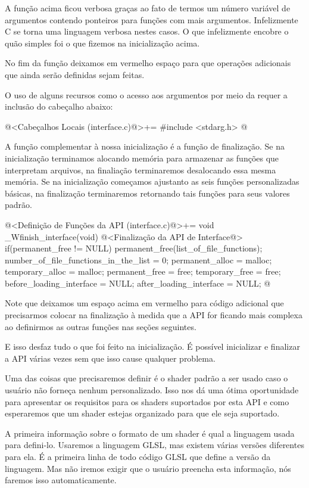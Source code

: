 A função acima ficou verbosa graças ao fato de termos um número
variável de argumentos contendo ponteiros para funções com mais
argumentos. Infelizmente C se torna uma linguagem verbosa nestes
casos. O que infelizmente encobre o quão simples foi o que fizemos na
inicialização acima.

No fim da função deixamos em vermelho espaço para que operações
adicionais que ainda serão definidas sejam feitas.

O uso de alguns recursos como o acesso aos argumentos por meio da
 requer a inclusão do cabeçalho abaixo:

\iniciocodigo
@<Cabeçalhos Locais (interface.c)@>+=
#include <stdarg.h>
@
\fimcodigo


A função complementar à nossa inicialização é a função de
finalização. Se na inicialização terminamos alocando memória para
armazenar as funções que interpretam arquivos, na finaliação
terminaremos desalocando essa mesma memória. Se na inicialização
começamos ajustanto as seis funções personalizadas básicas, na
finalização terminaremos retornando tais funções para seus valores
padrão.

\iniciocodigo
@<Definição de Funções da API (interface.c)@>+=
void _Wfinish_interface(void){
  @<Finalização da API de Interface@>
  if(permanent_free != NULL)
    permanent_free(list_of_file_functions);
  number_of_file_functions_in_the_list = 0;
  permanent_alloc = malloc;
  temporary_alloc = malloc;
  permanent_free = free;
  temporary_free = free;
  before_loading_interface = NULL;
  after_loading_interface = NULL;
}
@
\fimcodigo

Note que deixamos um espaço acima em vermelho para código adicional
que precisarmos colocar na finalização à medida que a API for ficando
mais complexa ao definirmos as outras funções nas seções seguintes.

E isso desfaz tudo o que foi feito na inicialização. É possível
inicializar e finalizar a API várias vezes sem que isso cause qualquer
problema.


Uma das coisas que precisaremos definir é o shader padrão a ser usado
caso o usuário não forneça nenhum personalizado. Isso nos dá uma ótima
oportunidade para apresentar os requisitos para os shaders suportados
por esta API e como esperaremos que um shader estejas organizado para
que ele seja suportado.

A primeira informação sobre o formato de um shader é qual a linguagem
usada para defini-lo. Usaremos a linguagem GLSL, mas existem várias
versões diferentes para ela. É a primeira linha de todo código GLSL
que define a versão da linguagem. Mas não iremos exigir que o usuário
preencha esta informação, nós faremos isso automaticamente.

